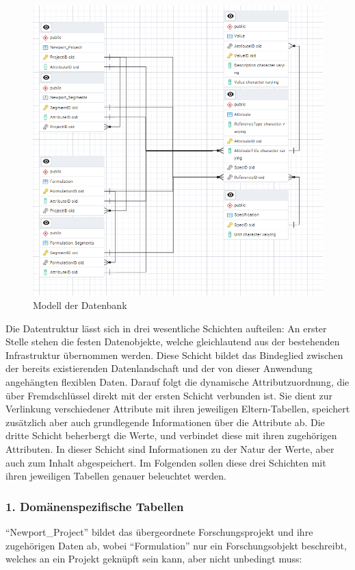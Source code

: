 \begin{figure}[H]
    \centering
    \includegraphics[width=\textwidth]{./img/datenstruktur.png} 
    \caption{Modell der Datenbank}
    \label{fig:deinbild}
\end{figure}
Die Datentruktur lässt sich in drei wesentliche Schichten aufteilen: An erster Stelle stehen die festen Datenobjekte, 
welche gleichlautend aus der bestehenden Infrastruktur übernommen werden. Diese Schicht bildet das Bindeglied zwischen der bereits existierenden Datenlandschaft 
und der von dieser Anwendung angehängten flexiblen Daten. Darauf folgt die dynamische Attributzuordnung, die über Fremdschlüssel direkt mit der ersten Schicht verbunden ist.
Sie dient zur Verlinkung verschiedener Attribute mit ihren jeweiligen Eltern-Tabellen, speichert zusätzlich aber auch grundlegende Informationen über die Attribute ab. 
Die dritte Schicht beherbergt die Werte, und verbindet diese mit ihren zugehörigen Attributen. In dieser Schicht sind Informationen zu der Natur der Werte, aber auch zum Inhalt abgespeichert. 
Im Folgenden sollen diese drei Schichten mit ihren jeweiligen Tabellen genauer beleuchtet werden. 
\subsubsection{1. Domänenspezifische Tabellen}
\enquote{Newport\_Project} bildet das übergeordnete Forschungsprojekt und ihre zugehörigen Daten ab, wobei \enquote{Formulation} nur ein Forschungsobjekt beschreibt, welches an ein Projekt geknüpft sein kann,
aber nicht unbedingt muss: 


